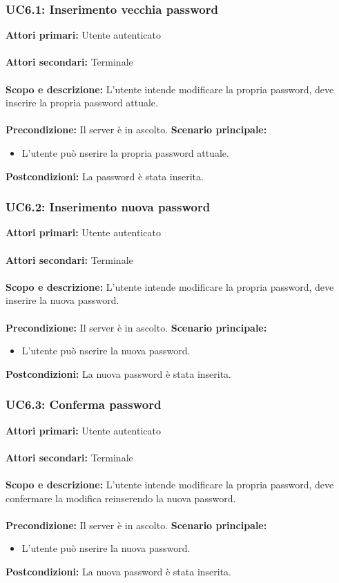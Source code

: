 \documentclass{scalatekids-article}
\begin{document}
\subsubsection{UC6.1: Inserimento vecchia password}

\textbf{Attori primari:} Utente autenticato\\ \\
\textbf{Attori secondari:} Terminale\\ \\
\textbf{Scopo e descrizione:} L'utente intende modificare la propria password, deve inserire la propria password attuale.\\ \\
\textbf{Precondizione:} Il server è in ascolto.
\textbf{Scenario principale:}
\begin{itemize}
\item L'utente può nserire la propria password attuale.
\end{itemize}
\textbf{Postcondizioni:} La password è stata inserita.

\subsubsection{UC6.2: Inserimento nuova password}

\textbf{Attori primari:} Utente autenticato\\ \\
\textbf{Attori secondari:} Terminale\\ \\
\textbf{Scopo e descrizione:} L'utente intende modificare la propria password, deve inserire la nuova password.\\ \\
\textbf{Precondizione:} Il server è in ascolto.
\textbf{Scenario principale:}
\begin{itemize}
\item L'utente può nserire la nuova password.
\end{itemize}
\textbf{Postcondizioni:} La nuova password è stata inserita.

\subsubsection{UC6.3: Conferma password}

\textbf{Attori primari:} Utente autenticato\\ \\
\textbf{Attori secondari:} Terminale\\ \\
\textbf{Scopo e descrizione:} L'utente intende modificare la propria password, deve confermare la modifica reinserendo la nuova password.\\ \\
\textbf{Precondizione:} Il server è in ascolto.
\textbf{Scenario principale:}
\begin{itemize}
\item L'utente può nserire la nuova password.
\end{itemize}
\textbf{Postcondizioni:} La nuova password è stata inserita.
\end{document}
